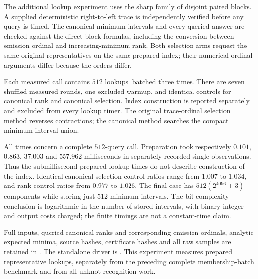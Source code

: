 The additional lookup experiment uses the sharp family of disjoint paired
blocks.  A supplied deterministic right-to-left trace is independently
verified before any query is timed.  The canonical minimum intervals and
every queried answer are checked against the direct block formulas, including
the conversion between emission ordinal and increasing-minimum rank.  Both
selection arms request the same original representatives on the same prepared
index; their numerical ordinal arguments differ because the orders differ.

Each measured call contains $512$ lookups, batched three times.  There are
seven shuffled measured rounds, one excluded warmup, and identical controls
for canonical rank and canonical selection.  Index construction is reported
separately and excluded from every lookup timer.  The original trace-ordinal
selection method reverses contractions; the canonical method searches the
compact minimum-interval union.

\begin{table}[htbp]
\centering
\caption{Prepared representative selection: 512 queries per call. Both selection
arms return the same source minima using their corresponding ordinals.
Preparation is excluded here and reported in the text. Times are milliseconds.}
\label{tab:orbit-rank}

\end{table}


All times concern a complete $512$-query call.  Preparation took respectively
$0.101$, $0.863$, $37.003$ and $557.962$ milliseconds in separately recorded
single observations.  Thus the submillisecond prepared lookup times do not
describe construction of the index.  Identical canonical-selection control
ratios range from $1.007$ to $1.034$, and rank-control ratios from $0.977$ to
$1.026$.  The final case has $512(2^{4096}+3)$ components while storing just
$512$ minimum intervals.  The bit-complexity conclusion is logarithmic in
the number of stored intervals, with binary-integer and output costs charged;
the finite timings are not a constant-time claim.

Full inputs, queried canonical ranks and corresponding emission ordinals,
analytic expected minima, source hashes, certificate hashes and all raw
samples are retained in .  The standalone
driver is .  This experiment measures
prepared representative lookups, separately from the preceding complete
membership-batch benchmark and from all unknot-recognition work.
